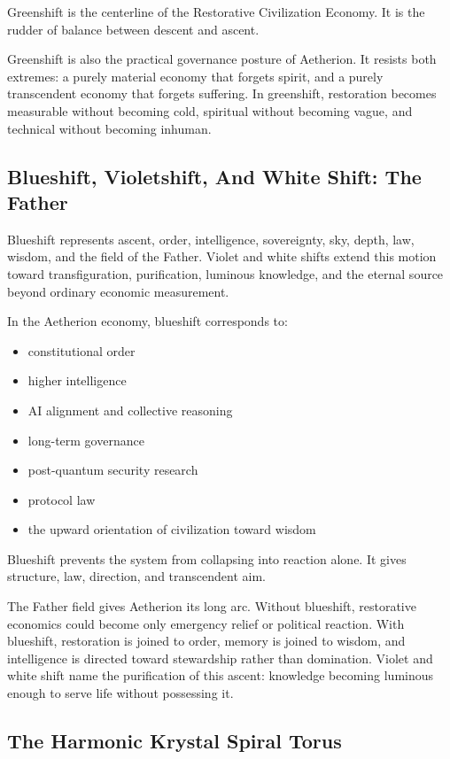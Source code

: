 \documentclass[12pt]{article}
\begin{document}
Greenshift is the centerline of the Restorative Civilization Economy. It is the rudder of balance between descent and ascent.

Greenshift is also the practical governance posture of Aetherion. It resists both extremes: a purely material economy that forgets spirit, and a purely transcendent economy that forgets suffering. In greenshift, restoration becomes measurable without becoming cold, spiritual without becoming vague, and technical without becoming inhuman.

\subsection{Blueshift, Violetshift, And White Shift: The Father}

Blueshift represents ascent, order, intelligence, sovereignty, sky, depth, law, wisdom, and the field of the Father. Violet and white shifts extend this motion toward transfiguration, purification, luminous knowledge, and the eternal source beyond ordinary economic measurement.

In the Aetherion economy, blueshift corresponds to:

\begin{itemize}
  \item constitutional order
  \item higher intelligence
  \item AI alignment and collective reasoning
  \item long-term governance
  \item post-quantum security research
  \item protocol law
  \item the upward orientation of civilization toward wisdom
\end{itemize}

Blueshift prevents the system from collapsing into reaction alone. It gives structure, law, direction, and transcendent aim.

The Father field gives Aetherion its long arc. Without blueshift, restorative economics could become only emergency relief or political reaction. With blueshift, restoration is joined to order, memory is joined to wisdom, and intelligence is directed toward stewardship rather than domination. Violet and white shift name the purification of this ascent: knowledge becoming luminous enough to serve life without possessing it.

\subsection{The Harmonic Krystal Spiral Torus}
\end{document}
